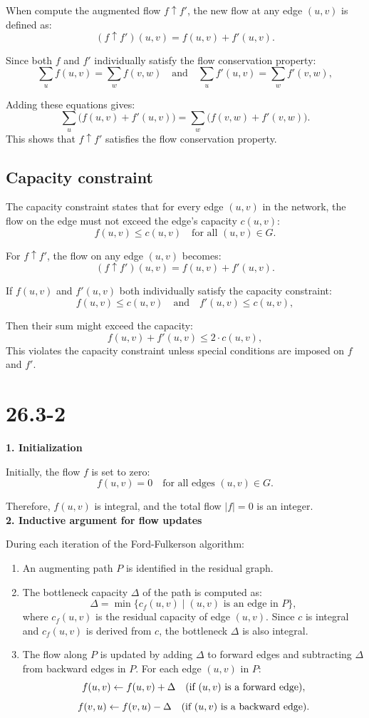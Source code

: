 \documentclass[12pt]{article}
\begin{document}
When compute the augmented flow $f \uparrow f'$, the new flow at any edge $(u, v)$ is defined as:
\[
(f \uparrow f')(u, v) = f(u, v) + f'(u, v).
\]

Since both $f$ and $f'$ individually satisfy the flow conservation property:
\[
\sum_{u} f(u, v) = \sum_{w} f(v, w) \quad \text{and} \quad \sum_{u} f'(u, v) = \sum_{w} f'(v, w),
\]

Adding these equations gives:
\[
\sum_{u} \big(f(u, v) + f'(u, v)\big) = \sum_{w} \big(f(v, w) + f'(v, w)\big).
\]
This shows that $f \uparrow f'$ satisfies the flow conservation property.

\subsection{Capacity constraint}
The capacity constraint states that for every edge $(u, v)$ in the network, the flow on the edge must not exceed the edge's capacity $c(u, v)$:
\[
f(u, v) \leq c(u, v) \quad \text{for all } (u, v) \in G.
\]

For $f \uparrow f'$, the flow on any edge $(u, v)$ becomes:
\[
(f \uparrow f')(u, v) = f(u, v) + f'(u, v).
\]

If $f(u, v)$ and $f'(u, v)$ both individually satisfy the capacity constraint:
\[
f(u, v) \leq c(u, v) \quad \text{and} \quad f'(u, v) \leq c(u, v),
\]

Then their sum might exceed the capacity:
\[
f(u, v) + f'(u, v) \leq 2 \cdot c(u, v),
\]
This violates the capacity constraint unless special conditions are imposed on $f$ and $f'$.
\section{26.3-2}
\textbf{1. Initialization}  

Initially, the flow \( f \) is set to zero:
\[
f(u, v) = 0 \quad \text{for all edges } (u, v) \in G.
\]

Therefore, \( f(u, v) \) is integral, and the total flow \( |f| = 0 \) is an integer.\\
\textbf{2. Inductive argument for flow updates}  

During each iteration of the Ford-Fulkerson algorithm:
\begin{enumerate}
    \item An augmenting path \( P \) is identified in the residual graph.
    \item The bottleneck capacity \( \Delta \) of the path is computed as:
    \[
    \Delta = \min \{ c_f(u, v) \mid (u, v) \text{ is an edge in } P \},
    \]
    where \( c_f(u, v) \) is the residual capacity of edge \( (u, v) \).  
    Since \( c \) is integral and \( c_f(u, v) \) is derived from \( c \), the bottleneck \( \Delta \) is also integral.
    \item The flow along \( P \) is updated by adding \( \Delta \) to forward edges and subtracting \( \Delta \) from backward edges in \( P \). For each edge \( (u, v) \) in \( P \):
    \[
    f(u, v) \gets f(u, v) + \Delta \quad \text{(if \( (u, v) \) is a forward edge)},
    \]
    \[
    f(v, u) \gets f(v, u) - \Delta \quad \text{(if \( (u, v) \) is a backward edge)}.
    \]
\end{enumerate}
\end{document}
